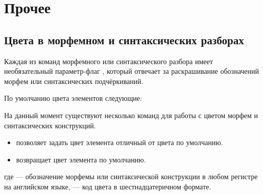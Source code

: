 \section{Прочее}

\subsection{Цвета в морфемном и синтаксических разборах}

Каждая из команд морфемного или синтаксического разбора имеет необязательный
параметр-флаг \manKwargs[color], который отвечает за раскрашивание обозначений морфем
или синтаксических подчёркиваний.

По умолчанию цвета элементов следующие:




На данный момент существуют несколько команд для работы с цветом морфем и
синтаксических конструкций.
\begin{itemize}
    \item \manModifier[rsSetColor] позволяет задать цвет элемента отличный от цвета по
    умолчанию.
        \ExplSyntaxOn
        \begin{tcolorbox}
            \manModifier[cmd] \manColon{}
        \end{tcolorbox}
        \ExplSyntaxOff
    \item \manModifier[rsResetColor] возвращает цвет элемента по умолчанию.
        \ExplSyntaxOn
        \begin{tcolorbox}
            \manModifier[cmd] \manColon{}
        \end{tcolorbox}
        \ExplSyntaxOff
\end{itemize}

где  --- обозначение морфемы или синтаксической конструкции в любом
регистре на английском языке,  --- код цвета в шестнадцатеричном формате.

